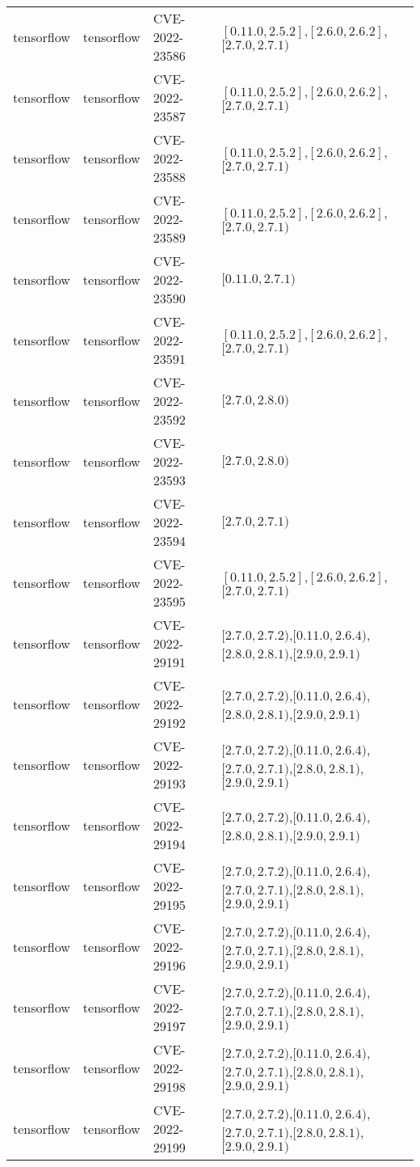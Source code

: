 \begin{tabular}{llll}
tensorflow & tensorflow & CVE-2022-23586 & $[0.11.0,2.5.2]$,$[2.6.0,2.6.2]$,$[2.7.0,2.7.1)$ \\
tensorflow & tensorflow & CVE-2022-23587 & $[0.11.0,2.5.2]$,$[2.6.0,2.6.2]$,$[2.7.0,2.7.1)$ \\
tensorflow & tensorflow & CVE-2022-23588 & $[0.11.0,2.5.2]$,$[2.6.0,2.6.2]$,$[2.7.0,2.7.1)$ \\
tensorflow & tensorflow & CVE-2022-23589 & $[0.11.0,2.5.2]$,$[2.6.0,2.6.2]$,$[2.7.0,2.7.1)$ \\
tensorflow & tensorflow & CVE-2022-23590 & $[0.11.0,2.7.1)$ \\
tensorflow & tensorflow & CVE-2022-23591 & $[0.11.0,2.5.2]$,$[2.6.0,2.6.2]$,$[2.7.0,2.7.1)$ \\
tensorflow & tensorflow & CVE-2022-23592 & $[2.7.0,2.8.0)$ \\
tensorflow & tensorflow & CVE-2022-23593 & $[2.7.0,2.8.0)$ \\
tensorflow & tensorflow & CVE-2022-23594 & $[2.7.0,2.7.1)$ \\
tensorflow & tensorflow & CVE-2022-23595 & $[0.11.0,2.5.2]$,$[2.6.0,2.6.2]$,$[2.7.0,2.7.1)$ \\
tensorflow & tensorflow & CVE-2022-29191 & $[2.7.0,2.7.2)$,$[0.11.0,2.6.4)$,$[2.8.0,2.8.1)$,$[2.9.0,2.9.1)$ \\
tensorflow & tensorflow & CVE-2022-29192 & $[2.7.0,2.7.2)$,$[0.11.0,2.6.4)$,$[2.8.0,2.8.1)$,$[2.9.0,2.9.1)$ \\
tensorflow & tensorflow & CVE-2022-29193 & $[2.7.0,2.7.2)$,$[0.11.0,2.6.4)$,$[2.7.0,2.7.1)$,$[2.8.0,2.8.1)$,$[2.9.0,2.9.1)$ \\
tensorflow & tensorflow & CVE-2022-29194 & $[2.7.0,2.7.2)$,$[0.11.0,2.6.4)$,$[2.8.0,2.8.1)$,$[2.9.0,2.9.1)$ \\
tensorflow & tensorflow & CVE-2022-29195 & $[2.7.0,2.7.2)$,$[0.11.0,2.6.4)$,$[2.7.0,2.7.1)$,$[2.8.0,2.8.1)$,$[2.9.0,2.9.1)$ \\
tensorflow & tensorflow & CVE-2022-29196 & $[2.7.0,2.7.2)$,$[0.11.0,2.6.4)$,$[2.7.0,2.7.1)$,$[2.8.0,2.8.1)$,$[2.9.0,2.9.1)$ \\
tensorflow & tensorflow & CVE-2022-29197 & $[2.7.0,2.7.2)$,$[0.11.0,2.6.4)$,$[2.7.0,2.7.1)$,$[2.8.0,2.8.1)$,$[2.9.0,2.9.1)$ \\
tensorflow & tensorflow & CVE-2022-29198 & $[2.7.0,2.7.2)$,$[0.11.0,2.6.4)$,$[2.7.0,2.7.1)$,$[2.8.0,2.8.1)$,$[2.9.0,2.9.1)$ \\
tensorflow & tensorflow & CVE-2022-29199 & $[2.7.0,2.7.2)$,$[0.11.0,2.6.4)$,$[2.7.0,2.7.1)$,$[2.8.0,2.8.1)$,$[2.9.0,2.9.1)$ \\

\end{tabular}
